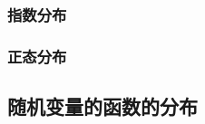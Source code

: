 \subsubsection{指数分布}
\paragraph{}

\subsubsection{正态分布}
\paragraph{}

\subsection{随机变量的函数的分布}
\paragraph{}
